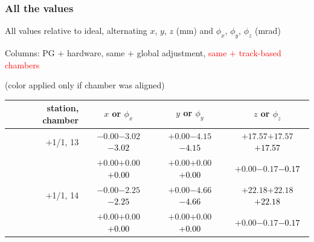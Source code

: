 \documentclass[compress]{beamer}
\begin{document}
\begin{frame}
\frametitle{All the values}
\tiny

All values relative to ideal, alternating $x$, $y$, $z$ (mm) and $\phi_x$, $\phi_y$, $\phi_z$ (mrad)

Columns: PG $+$ hardware, same $+$ global adjustment, \textcolor{red}{same $+$ track-based chambers}

\hfill (color applied only if chamber was aligned)

\vfill
\renewcommand{\arraystretch}{1.1}
\begin{tabular}{r | c | c | c}
station, chamber & $x$ or $\phi_x$ & $y$ or $\phi_y$ & $z$ or $\phi_z$ \\\hline
$+$1/1, 13 & $-0.00$\hspace{0.1 cm}$-3.02$\hspace{0.1 cm}\textcolor{black}{$-3.02$} & $+0.00$\hspace{0.1 cm}$-4.15$\hspace{0.1 cm}\textcolor{black}{$-4.15$} & $+17.57$\hspace{0.1 cm}$+17.57$\hspace{0.1 cm}\textcolor{black}{$+17.57$} \\
           & $+0.00$\hspace{0.1 cm}$+0.00$\hspace{0.1 cm}\textcolor{black}{$+0.00$} & $+0.00$\hspace{0.1 cm}$+0.00$\hspace{0.1 cm}\textcolor{black}{$+0.00$} & $+0.00$\hspace{0.1 cm}$-0.17$\hspace{0.1 cm}\textcolor{black}{$-0.17$} \\
$+$1/1, 14 & $-0.00$\hspace{0.1 cm}$-2.25$\hspace{0.1 cm}\textcolor{black}{$-2.25$} & $+0.00$\hspace{0.1 cm}$-4.66$\hspace{0.1 cm}\textcolor{black}{$-4.66$} & $+22.18$\hspace{0.1 cm}$+22.18$\hspace{0.1 cm}\textcolor{black}{$+22.18$} \\
           & $+0.00$\hspace{0.1 cm}$+0.00$\hspace{0.1 cm}\textcolor{black}{$+0.00$} & $+0.00$\hspace{0.1 cm}$+0.00$\hspace{0.1 cm}\textcolor{black}{$+0.00$} & $+0.00$\hspace{0.1 cm}$-0.17$\hspace{0.1 cm}\textcolor{black}{$-0.17$} \\

\end{tabular}
\end{frame}
\end{document}
